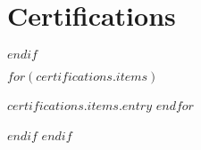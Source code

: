 \documentclass[letterpaper,10pt,final]{moderncv}
\begin{document}
\section{Certifications}
$endif$
\begin{list}{}{\leftmargin=1em \itemindent=-1em \itemsep=0.25em}
$for(certifications.items)$
\item $certifications.items.entry$
$endfor$
\end{list}
$endif$
$endif$


\end{document}
